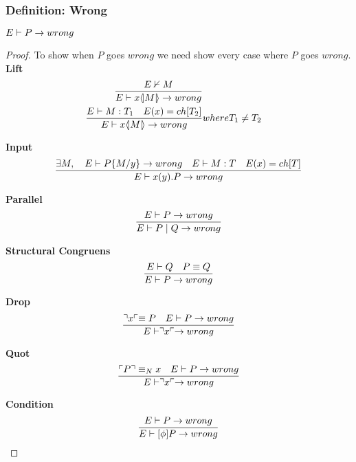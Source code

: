 \subsubsection{Definition: Wrong}
\ensuremath{E \vdash P \ra wrong} 
\begin{proof}
To show when \ensuremath{P} goes \ensuremath{wrong} we need show every case where \ensuremath{P} goes \ensuremath{wrong}.\\
\textbf{Lift} \begin{align*}
\frac{E \nvdash M}{E \vdash x \langle \! | M | \! \rangle \rightarrow wrong}\\
\frac{E \vdash M:T_1 \quad E(x)=ch[T_2]}{E \vdash x \langle \! | M | \! \rangle \rightarrow wrong} &where T_1 \neq T_2
\end{align*}

\textbf{Input} \begin{align*}
\frac{\exists M,\quad E \vdash P\{ M/ y\} \rightarrow wrong \quad E \vdash M:T \quad E(x)= ch[T]} {E \vdash x(y).P \rightarrow wrong}\\
\end{align*}

\textbf{Parallel} \begin{align*}
\frac{E \vdash P \rightarrow wrong}{E \vdash P \mid Q \rightarrow wrong}
\end{align*}

\textbf{Structural Congruens} \begin{align*}
\frac{E \vdash Q \quad P \equiv Q}{E \vdash P \rightarrow wrong}
\end{align*}

\textbf{Drop}\begin{align*}
\frac{\urcorner x \ulcorner \equiv P \quad E \vdash P \rightarrow wrong}{E \vdash \urcorner x \ulcorner \rightarrow wrong}
\end{align*}

\textbf{Quot}\begin{align*}
\frac{\ulcorner P \urcorner \equiv _N x \quad E \vdash P \rightarrow wrong}{E \vdash \urcorner x \ulcorner \rightarrow wrong}
\end{align*}

\textbf{Condition}\begin{align*}
\frac{E \vdash P \rightarrow wrong}{E \vdash [\phi]P \rightarrow wrong}
\end{align*}

\end{proof}




\FloatBarrier

